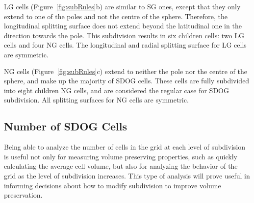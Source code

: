LG cells (Figure~\ref{fig:subRules}b) are similar to SG ones, except that they only extend to one of the poles and not the centre of the sphere. Therefore, the longitudinal splitting surface does not extend beyond the latitudinal one in the direction towards the pole. This subdivision results in six children cells: two LG cells and four NG cells. The longitudinal and radial splitting surface for LG cells are symmetric.

NG cells (Figure~\ref{fig:subRules}c) extend to neither the pole nor the centre of the sphere, and make up the majority of SDOG cells. These cells are fully subdivided into eight children NG cells, and are considered the regular case for SDOG subdivision. All splitting surfaces for NG cells are symmetric. 


\subsection{Number of SDOG Cells} \label{sec:numCells}
Being able to analyze the number of cells in the grid at each level of subdivision is useful not only for measuring volume preserving properties, such as quickly calculating the average cell volume, but also for analyzing the behavior of the grid as the level of subdivision increases. This type of analysis will prove useful in informing decisions about how to modify subdivision to improve volume preservation. 

